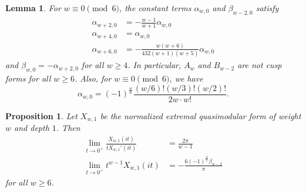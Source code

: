 \documentclass[10pt,a4paper]{amsart}
\newtheorem{lemma}{Lemma}
\newtheorem{proposition}{Proposition}
\begin{document}
\begin{lemma}
    \label{lem:n0coeff}
    For $w \equiv 0 \pmod{6}$, the constant terms $\alpha_{w,0}$ and $\beta_{w-2,0}$ satisfy
    \begin{align}
        \alpha_{w+2,0} &= -\frac{w-1}{w+1} \alpha_{w,0} \label{eqn:alphaw2} \\
        \alpha_{w+4,0} &= \alpha_{w,0} \label{eqn:alphaw4} \\
        \alpha_{w+6,0} &= -\frac{w(w+6)}{432(w+1)(w+5)} \alpha_{w,0} \label{eqn:alphaw6}
    \end{align}
    and $\beta_{w,0} = -\alpha_{w+2,0}$ for all $w \ge 4$.
    In particular, $A_{w}$ and $B_{w-2}$ are not cusp forms for all $w \ge 6$.
    Also, for $w \equiv 0 \pmod{6}$, we have
    \begin{equation}
        \label{eqn:alphawclosed}
        \alpha_{w,0} = (-1)^{\frac{w}{6}}\frac{(w/6)! (w/3)! (w/2)! }{2w \cdot w!}.
    \end{equation}
\end{lemma}

\begin{proposition}
    \label{prop:Xw1limit}
    Let $X_{w, 1}$ be the normalized extremal quasimodular form of weight $w$ and depth $1$.
    Then
    \begin{align}
        \lim_{t \to 0^+} \frac{X_{w, 1}(it)}{t X_{w, 1}'(it)} &= \frac{2\pi}{w-1} \label{eqn:extremallimit} \\
        \lim_{t \to 0^+} t^{w-1} X_{w, 1}(it) &= -\frac{6(-1)^{\frac{w}{2}}\beta_{w-2}}{\pi} \label{eqn:extremallimit2}
    \end{align}
    for all $w \ge 6$.
\end{proposition}
\end{document}

